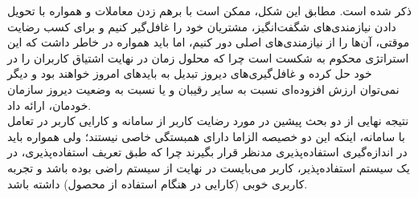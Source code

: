 ذکر شده است. مطابق این شکل، ممکن است با برهم زدن معاملات و همواره با تحویل دادن نیاز‌مندی‌های شگفت‌انگیز، مشتریان خود را غافل‌گیر کنیم و برای کسب رضایت موقتی، آن‌ها را از نیازمندی‌های اصلی دور کنیم، اما باید همواره در خاطر داشت که این استراتژی محکوم به شکست است چرا که محلول زمان در نهایت اشتیاق کاربران را در خود حل کرده و غافل‌گیری‌های دیروز تبدیل به باید‌های امروز خواهند بود و دیگر نمی‌توان ارزش افزوده‌ای نسبت به سایر رقیبان و یا نسبت به وضعیت دیروز سازمان خودمان، ارائه داد.\\
نتیجه نهایی از دو بحث پیشین در مورد رضایت کاربر از سامانه و کارایی کاربر در تعامل با سامانه، اینکه این دو خصیصه الزاما دارای همبستگی خاصی نیستند؛ ولی همواره باید در اندازه‌گیری استفاده‌پذیری مدنظر قرار بگیرند چرا که طبق تعریف استفاده‌پذیری، در یک سیستم استفاده‌پذیر، کاربر می‌بایست در نهایت از سیستم راضی بوده باشد و تجربه کاربری خوبی (کارایی در هنگام استفاده از محصول) داشته باشد.
